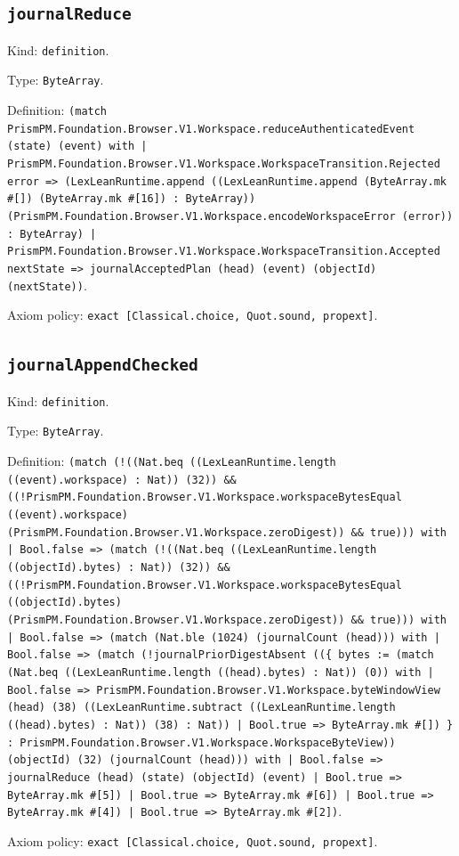 \documentclass[11pt]{article}
\begin{document}
\subsection*{\texttt{journalReduce}}
\noindent Kind: \texttt{definition}.\par
\noindent Type: \texttt{ByteArray}.\par
\noindent Definition: \texttt{(match PrismPM.Foundation.Browser.V1.Workspace.reduceAuthenticatedEvent (state) (event) with | PrismPM.Foundation.Browser.V1.Workspace.WorkspaceTransition.Rejected error => (LexLeanRuntime.append ((LexLeanRuntime.append (ByteArray.mk \#[]) (ByteArray.mk \#[16]) : ByteArray)) (PrismPM.Foundation.Browser.V1.Workspace.encodeWorkspaceError (error)) : ByteArray) | PrismPM.Foundation.Browser.V1.Workspace.WorkspaceTransition.Accepted nextState => journalAcceptedPlan (head) (event) (objectId) (nextState))}.\par
\noindent Axiom policy: \texttt{exact [Classical.choice, Quot.sound, propext]}.\par
\subsection*{\texttt{journalAppendChecked}}
\noindent Kind: \texttt{definition}.\par
\noindent Type: \texttt{ByteArray}.\par
\noindent Definition: \texttt{(match (!((Nat.beq ((LexLeanRuntime.length ((event).workspace) : Nat)) (32)) \&\& ((!PrismPM.Foundation.Browser.V1.Workspace.workspaceBytesEqual ((event).workspace) (PrismPM.Foundation.Browser.V1.Workspace.zeroDigest)) \&\& true))) with | Bool.false => (match (!((Nat.beq ((LexLeanRuntime.length ((objectId).bytes) : Nat)) (32)) \&\& ((!PrismPM.Foundation.Browser.V1.Workspace.workspaceBytesEqual ((objectId).bytes) (PrismPM.Foundation.Browser.V1.Workspace.zeroDigest)) \&\& true))) with | Bool.false => (match (Nat.ble (1024) (journalCount (head))) with | Bool.false => (match (!journalPriorDigestAbsent ((\{ bytes := (match (Nat.beq ((LexLeanRuntime.length ((head).bytes) : Nat)) (0)) with | Bool.false => PrismPM.Foundation.Browser.V1.Workspace.byteWindowView (head) (38) ((LexLeanRuntime.subtract ((LexLeanRuntime.length ((head).bytes) : Nat)) (38) : Nat)) | Bool.true => ByteArray.mk \#[]) \} : PrismPM.Foundation.Browser.V1.Workspace.WorkspaceByteView)) (objectId) (32) (journalCount (head))) with | Bool.false => journalReduce (head) (state) (objectId) (event) | Bool.true => ByteArray.mk \#[5]) | Bool.true => ByteArray.mk \#[6]) | Bool.true => ByteArray.mk \#[4]) | Bool.true => ByteArray.mk \#[2])}.\par
\noindent Axiom policy: \texttt{exact [Classical.choice, Quot.sound, propext]}.\par
\end{document}
